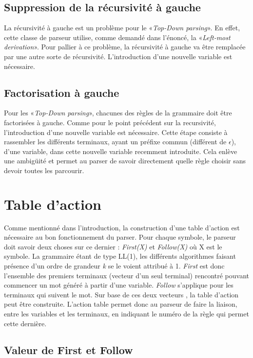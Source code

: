 \documentclass[pdftex,10pt,a4paper]{article}
\begin{document}
\subsection{Suppression de la récursivité à gauche}
La récursivité à gauche est un problème pour le «\textit{Top-Down parsing}». En effet, cette classe de parseur utilise, comme demandé dans l'énoncé, la «\textit{Left-most derivation}». Pour pallier à ce problème, la récursivité à gauche va être remplacée par une autre sorte de récursivité. L'introduction d'une nouvelle variable est nécessaire.

\subsection{Factorisation à gauche}
Pour les «\textit{Top-Down parsing}», chacunes des règles de la grammaire doit être factorisées à gauche. Comme pour le point précédent sur la recursivité, l'introduction d'une nouvelle variable est nécessaire. Cette étape consiste à rassembler les différents terminaux, ayant un préfixe commun (différent de $\epsilon$), d'une variable, dans cette nouvelle variable recemment introduite. Cela enlève une ambigüité et permet au parser de savoir directement quelle règle choisir sans devoir toutes les parcourir.

\section{Table d'action}

Comme mentionné dans l'introduction, la construction d'une table d'action est nécessaire au bon fonctionnement du parser. Pour chaque symbole, le parseur doit savoir deux choses sur ce dernier : \textit{First(X)} et \textit{Follow(X)} où X est le symbole. La grammaire étant de type LL(1), les différents algorithmes faisant présence d'un ordre de grandeur \textit{k} se le voient attribué à 1. \textit{First} est donc l'ensemble des premiers terminaux (vecteur d'un seul terminal) rencontré pouvant commencer un mot généré à partir d'une variable. \textit{Follow} s'applique pour les terminaux qui suivent le mot. Sur base de ces deux vecteurs , la table d'action peut être construite. L'action table permet donc au parseur de faire la liaison, entre les variables et les terminaux, en indiquant le numéro de la règle qui permet cette dernière.

\subsection{Valeur de First et Follow}
\end{document}
